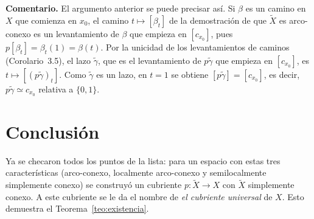 \documentclass[11pt]{article}
\begin{document}
\medskip\noindent\textbf{Comentario.} El argumento anterior se puede precisar así. Si $\beta$ es un camino en $X$ que comienza en $x_0$, el camino $t\mapsto[\beta_t]$ de la demostración de que $\tilde X$ es arco-conexo es un levantamiento de $\beta$ que empieza en $[c_{x_0}]$, pues $p[\beta_t]=\beta_t(1)=\beta(t)$. Por la unicidad de los levantamientos de caminos (Corolario~3.5), el lazo $\tilde\gamma$, que es el levantamiento de $p\tilde\gamma$ que empieza en $[c_{x_0}]$, es $t\mapsto[(p\tilde\gamma)_t]$. Como $\tilde\gamma$ es un lazo, en $t=1$ se obtiene $[p\tilde\gamma]=[c_{x_0}]$, es decir, $p\tilde\gamma\simeq c_{x_0}$ relativa a $\{0,1\}$.

\section*{Conclusión}

Ya se checaron todos los puntos de la lista: para un espacio con estas tres características (arco-conexo, localmente arco-conexo y semilocalmente simplemente conexo) se construyó un cubriente $p\colon\tilde X\to X$ con $\tilde X$ simplemente conexo. A este cubriente se le da el nombre de \emph{el cubriente universal} de $X$. Esto demuestra el Teorema~\ref{teo:existencia}.

\begin{erratas}
\end{erratas}
\end{document}
